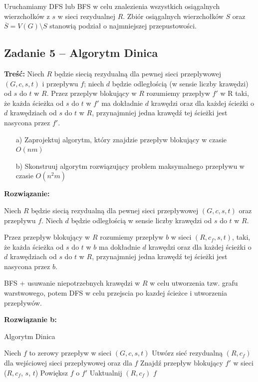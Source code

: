 Uruchamiamy DFS lub BFS w celu znalezienia wszystkich osiągalnych wierzchołków 
z $s$ w sieci rezydualnej $R$. Zbiór osiągalnych wierzchołków $S$ oraz 
$\overline{S} = V(G) \setminus S$ stanowią podział o najmniejszej 
przepustowości.

\subsection{Zadanie 5 -- Algorytm Dinica}
\textbf{Treść: } Niech $R$ będzie siecią rezydualną 
dla pewnej sieci przeplywowej $(G, c, s, t)$ i przepływu $f$; 
niech $d$ będzie
odległością (w sensie liczby krawędzi) od $s$ do $t$ w $R$. 
Przez przeplyw blokujący w $R$ rozumiemy przepływ $f'$ w R taki,
że każda ścieżka od $s$ do $t$ w $f'$ ma dokładnie 
$d$ krawędzi oraz dla każdej ścieżki o $d$ krawędziach od $s$ do $t$ w $R$,
przynajmniej jedna krawędź tej ścieżki jest nasycona przez $f'$.
\begin{itemize}
	\item[a)] Zaprojektuj algorytm, który znajdzie przepływ blokujący w czasie $O(nm)$
	\item[b)] Skonstruuj algorytm rozwiązujący problem maksymalnego przepływu w czasie $O(n^2m)$
\end{itemize}
\textbf{Rozwiązanie: }

\begin{defi}
	Niech $R$ będzie siecią rezydualną dla pewnej sieci przepływowej
	$(G, c, s, t)$ oraz przepływu $f$. Niech $d$ będzie odległością w sensie
	liczby krawędzi od $s$ do $t$ w $R$.
	
	Przez przepływ blokujący w $R$ rozumiemy przepływ $b$ w sieci
	$(R, c_f, s, t)$, taki, że każda ścieżka od $s$ do $t$ 
	w $b$ ma dokładnie $d$ krawędzi oraz dla każdej ścieżki o $d$ 
	krawędziach od $s$ do $t$ w $R$, przynajmniej jedna krawędź tej ścieżki
	jest nasycona przez $b$.
\end{defi}

BFS + usuwanie niepotrzebnych krawędzi w $R$ w celu utworzenia tzw. 
grafu warstwowego, potem DFS w celu przejscia po kazdej ścieżce
i utworzenia przepływów.

\textbf{Rozwiązanie b: }

\begin{algorithm}[H]
	\caption{Algorytm Dinica}
	\begin{algorithmic}[1]
		\State Niech $f$ to zerowy przepływ w sieci $(G,c,s,t)$
		\State Utwórz sieć rezydualną $(R, c_f)$ dla wejściowej 
		sieci przepływowej oraz dla $f$ 
		\State Znajdź przepływ blokujący $f'$ w sieci ($R, c_f$, $s$, $t$)
		\State Powiększ $f$ o $f'$
		\State Uaktualnij $(R, c_f)$
		\EndWhile
		\State \Return $f$
		\EndProcedure
	\end{algorithmic}
	\label{alg:dinic}
\end{algorithm}

